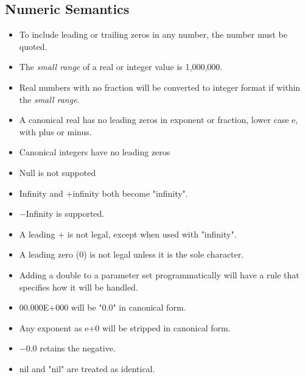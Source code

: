 \documentclass{memarticle}
\begin{document}
{                \subsection{Numeric Semantics}
                        \begin{itemize}
                                \item To include leading or trailing zeros in any number,
                                      the number must be quoted.
                                \item The \emph{small range} of a real or integer value is 1,000,000.
                                \item Real numbers with no fraction will be converted to integer format
                                      if within the \emph{small range}.
                                \item A canonical real has no leading zeros in exponent or fraction, lower case e, with plus or minus.
                                \item Canonical integers have no leading zeros
                                \item Null is not suppoted
                                \item Infinity and $+$infinity both become "infinity".
                                \item $-$Infinity is supported.
                                \item A leading $+$ is not legal, except when used with "infinity".
                                \item A leading zero (0) is not legal unless it is the sole character.
                                \item Adding a double to a parameter set programmatically will have a rule that specifies how it will be handled.
                                \item 00.000E$+$000 will be "0.0" in canonical form.
                                \item Any exponent as e$+$0 will be stripped in canonical form.
                                \item $-$0.0 retains the negative.
                                \item nil and "nil" are treated as identical.        
                        \end{itemize}
}
\end{document}
